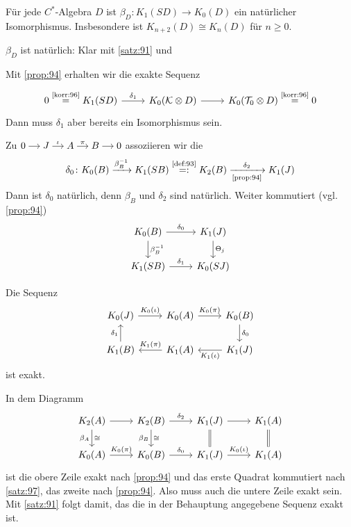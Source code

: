 \begin{satz}[{name={Bott-Periodizität}},label=satz:97]
	Für jede $C^*$-Algebra $D$ ist $\beta_D \colon K_1(SD) \to K_0(D)$ ein natürlicher Isomorphismus.
	Insbesondere ist $K_{n+2}(D) \cong K_n(D)$ für $n \ge 0$.
\end{satz}
\begin{beweis}
	$\beta_D$ ist natürlich: Klar mit \autoref{satz:91} und 
	
	Mit \autoref{prop:94} erhalten wir die exakte Sequenz
	\[
		\begin{tikzcd}
			0 \StackText{\ref{korr:96}}{=} K_1(SD) \rar["\delta_1"] & K_0 \enbrace*{\mathcal{K} \otimes D} \rar & K_0(\mathcal{T}_0 \otimes D) \StackText{\ref{korr:96}}{=} 0
		\end{tikzcd}
	\]
	Dann muss $\delta_1$ aber bereits ein Isomorphismus sein.
\end{beweis}

Zu \(
	\begin{tikzcd}[cramped,sep=small]
		0 \rar & J \rar["\iota"] & A \rar["\pi"] & B \rar & 0
	\end{tikzcd}
\)
assoziieren wir die 
\[
	\delta_0 \colon K_0(B) \grenzw{\beta_B^{-1}} K_1(SB) \StackText{\ref{def:93}}{=:} K_2(B) \xrightarrow[\text{\ref{prop:94}}]{\minwidthbox{\delta_2}{1.4em}} K_1(J)
\]
Dann ist $\delta_0$ natürlich, denn $\beta_B$ und $\delta_2$ sind natürlich.
Weiter kommutiert (vgl. \autoref{prop:94})
\[
	\begin{tikzcd}
		K_0(B) \dar["\beta_B^{-1}"] \rar["\delta_0"] & K_1(J) \dar["\Theta_j"] \\
		K_1(SB) \rar["\delta_1"] & K_0(SJ)
	\end{tikzcd}
\]
\begin{satz}[name={6-Term-Sequenz}]
	Die Sequenz
	\[
		\begin{tikzcd}
			K_0(J) \rar["K_0(\iota)"] & K_0(A) \rar["K_0(\pi)"] & K_0(B) \dar["\delta_0"] \\
			K_1(B) \uar["\delta_1"] & K_1(A) \lar["K_1(\pi)"'] & K_1(J) \lar["K_1(\iota)"]
		\end{tikzcd}
	\]
	ist exakt.
\end{satz}
\begin{beweis}
	In dem Diagramm
	\[
		\begin{tikzcd}
			K_2(A) \rar \dar["\cong","\beta_A"'] & K_2(B) \rar["\delta_2"] \dar["\cong","\beta_B"'] & K_1(J)  \dar[equal] \rar & K_1(A) \dar[equal] \\
			K_0(A) \rar["K_0(\pi)"] & K_0(B) \rar["\delta_0"] & K_1(J) \rar["K_0(\iota)"] & K_1(A)
		\end{tikzcd}
	\]
	ist die obere Zeile exakt nach \autoref{prop:94} und das erste Quadrat kommutiert nach \autoref{satz:97}, das zweite nach \autoref{prop:94}.
	Also muss auch die untere Zeile exakt sein.
	Mit \autoref{satz:91} folgt damit, das die in der Behauptung angegebene Sequenz exakt ist.
\end{beweis}

